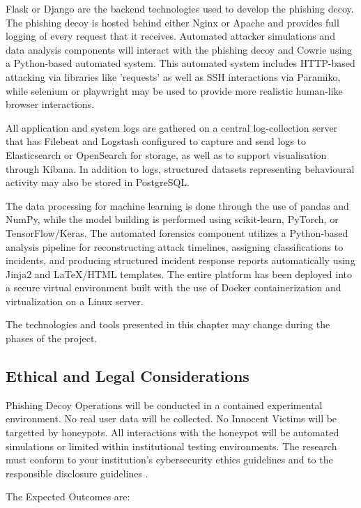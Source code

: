 Flask or Django are the backend technologies used to develop the phishing decoy. The phishing decoy is hosted behind either Nginx or Apache and provides full logging of every request that it receives. Automated attacker simulations and data analysis components will interact with the phishing decoy and Cowrie using a Python-based automated system. This automated system includes HTTP-based attacking via libraries like 'requests' as well as SSH interactions via Paramiko, while selenium or playwright may be used to provide more realistic human-like browser interactions.

All application and system logs are gathered on a central log-collection server that has Filebeat and Logstash configured to capture and send logs to Elasticsearch or OpenSearch for storage, as well as to support visualisation through Kibana. In addition to logs, structured datasets representing behavioural activity may also be stored in PostgreSQL.

The data processing for machine learning is done through the use of pandas and NumPy, while the model building is performed using scikit-learn, PyTorch, or TensorFlow/Keras. The automated forensics component utilizes a Python-based analysis pipeline for reconstructing attack timelines, assigning classifications to incidents, and producing structured incident response reports automatically using Jinja2 and LaTeX/HTML templates. The entire platform has been deployed into a secure virtual environment built with the use of Docker containerization and virtualization on a Linux server.

The technologies and tools presented in this chapter may change during the phases of the project.

\subsection{Ethical and Legal Considerations}

Phishing Decoy Operations will be conducted in a contained experimental environment. No real user data will be collected. No Innocent Victims will be targetted by honeypots. All interactions with the honeypot will be automated simulations or limited within institutional testing environments. The research must conform to your institution's cybersecurity ethics guidelines and to the responsible disclosure guidelines \cite{Bringer2012HoneypotSurvey,Seifert2006Taxonomy}.

The Expected Outcomes are:

